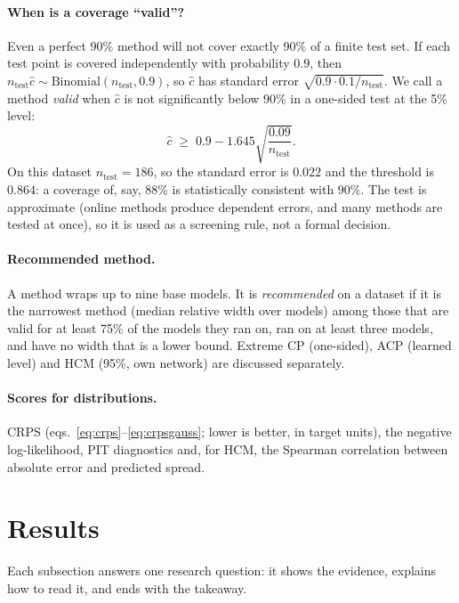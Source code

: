 \documentclass[11pt]{article}
\begin{document}
\paragraph{When is a coverage ``valid''?} Even a perfect 90\% method will not cover exactly 90\% of a finite test set. If each test
point is covered independently with probability $0.9$, then $n_{\text{test}}\hat c\sim\mathrm{Binomial}(n_{\text{test}},0.9)$, so
$\hat c$ has standard error $\sqrt{0.9\cdot0.1/n_{\text{test}}}$. We call a method \emph{valid} when $\hat c$ is not significantly
below 90\% in a one-sided test at the 5\% level:
\begin{equation}\label{eq:valid}
\hat c\;\ge\;0.9-1.645\sqrt{\frac{0.09}{n_{\text{test}}}} .
\end{equation}
On this dataset $n_{\text{test}}=186$, so the standard error is $0.022$ and the threshold is
$0.864$: a coverage of, say, 88\% is statistically consistent with 90\%.
The test is approximate (online methods produce dependent errors, and many methods are tested at once), so it is used as a
screening rule, not a formal decision.

\paragraph{Recommended method.} A method wraps up to nine base models. It is \emph{recommended} on a dataset if it is the
narrowest method (median relative width over models) among those that are valid for at least 75\% of the models they ran on,
ran on at least three models, and have no width that is a lower bound. Extreme CP (one-sided), ACP (learned level) and HCM (95\%,
own network) are discussed separately.

\paragraph{Scores for distributions.} CRPS (eqs.~\ref{eq:crps}--\ref{eq:crpsgauss}; lower is better, in target units), the negative
log-likelihood, PIT diagnostics and, for HCM, the Spearman correlation between absolute error and predicted spread.

\section{Results}\label{sec:results}
Each subsection answers one research question: it shows the evidence, explains how to read it, and ends with the takeaway.
\end{document}
